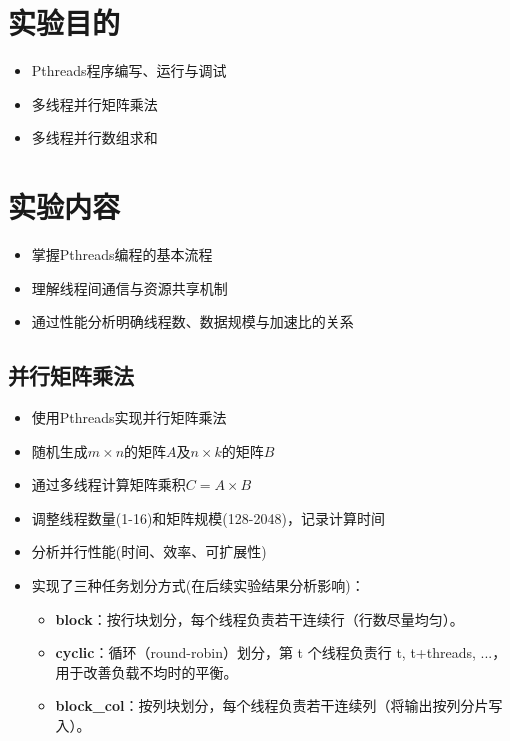 \documentclass{SYSUReport}
\date{2026年4月29日}
\begin{document}
\cover
\thispagestyle{empty} %
\clearpage



\section{实验目的}
\begin{itemize}
    \item Pthreads程序编写、运行与调试
    \item 多线程并行矩阵乘法
    \item 多线程并行数组求和
\end{itemize}

\section{实验内容}
\begin{itemize}
    \item 掌握Pthreads编程的基本流程
    \item 理解线程间通信与资源共享机制
    \item 通过性能分析明确线程数、数据规模与加速比的关系
\end{itemize}
\subsection{并行矩阵乘法}
\begin{itemize}
    \item 使用Pthreads实现并行矩阵乘法
    \item 随机生成$m \times n$的矩阵$A$及$n \times k$的矩阵$B$
    \item 通过多线程计算矩阵乘积$C = A \times B$
    \item 调整线程数量(1-16)和矩阵规模(128-2048)，记录计算时间
    \item 分析并行性能(时间、效率、可扩展性)
    \item 实现了三种任务划分方式(在后续实验结果分析影响)：
    \begin{itemize}
        \item \textbf{block}：按行块划分，每个线程负责若干连续行（行数尽量均匀）。
        \item \textbf{cyclic}：循环（round-robin）划分，第 t 个线程负责行 t, t+threads, ...，用于改善负载不均时的平衡。
        \item \textbf{block\_col}：按列块划分，每个线程负责若干连续列（将输出按列分片写入）。
    \end{itemize}
\end{itemize}
\end{document}
